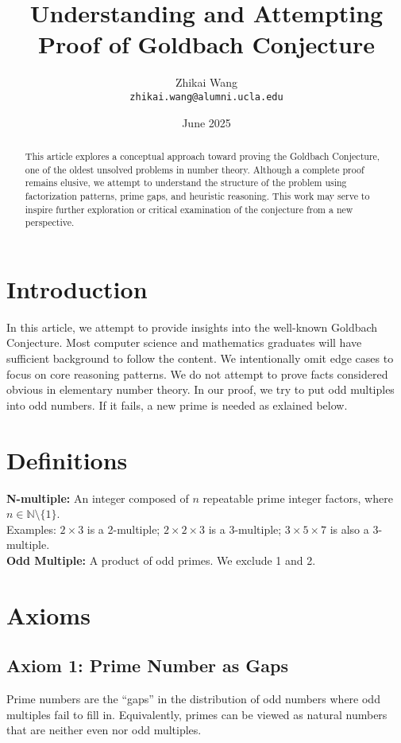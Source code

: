 \documentclass[12pt]{article}
\title{Understanding and Attempting Proof of Goldbach Conjecture}
\author{Zhikai Wang \\ \texttt{zhikai.wang@alumni.ucla.edu}}
\date{June 2025}
\theoremstyle{definition}
\begin{document}
\maketitle

\begin{abstract}
This article explores a conceptual approach toward proving the Goldbach Conjecture, one of the oldest unsolved problems in number theory. Although a complete proof remains elusive, we attempt to understand the structure of the problem using factorization patterns, prime gaps, and heuristic reasoning. This work may serve to inspire further exploration or critical examination of the conjecture from a new perspective.
\end{abstract}

\section{Introduction}
In this article, we attempt to provide insights into the well-known Goldbach Conjecture. Most computer science and mathematics graduates will have sufficient background to follow the content. We intentionally omit edge cases to focus on core reasoning patterns. We do not attempt to prove facts considered obvious in elementary number theory. In our proof, we try to put odd multiples into odd numbers. If it fails, a new prime is needed as exlained below.

\section{Definitions}
\textbf{N-multiple:} An integer composed of \( n \) repeatable prime integer factors, where \( n \in \mathbb{N} \setminus \{1\} \).\\
Examples: \( 2 \times 3 \) is a 2-multiple; \( 2 \times 2 \times 3 \) is a 3-multiple; \( 3 \times 5 \times 7 \) is also a 3-multiple.\\

\noindent \textbf{Odd Multiple:} A product of odd primes. We exclude 1 and 2.

\section{Axioms}
\subsection*{Axiom 1: Prime Number as Gaps}
Prime numbers are the “gaps” in the distribution of odd numbers where odd multiples fail to fill in. Equivalently, primes can be viewed as natural numbers that are neither even nor odd multiples.
\end{document}
